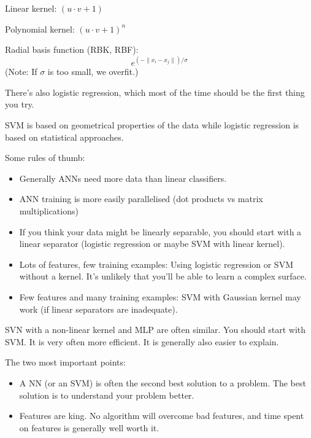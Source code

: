 \newpage

Linear kernel:
$(u\cdot v + 1)$

Polynomial kernel:
$(u\cdot v + 1)^n$

Radial basis function (RBK, RBF):
\begin{displaymath}
  e^{(-\parallel x_i - x_j\parallel) / \sigma}
\end{displaymath}
(Note: If $\sigma$ is too small, we overfit.)



There's also logistic regression, which most of the time should be the
first thing you try.

SVM is based on geometrical properties of the data while logistic
regression is based on statistical approaches.

Some rules of thumb:
\begin{itemize}
\item Generally ANNs need more data than linear classifiers.
\item ANN training is more easily parallelised (dot products vs matrix
  multiplications)
\item If you think your data might be linearly separable, you should
  start with a linear separator (logistic regression or maybe SVM with
  linear kernel).
\item Lots of features, few training examples: Using logistic
  regression or SVM without a kernel.  It's unlikely that you'll be
  able to learn a complex surface.
\item Few features and many training examples: SVM with Gaussian
  kernel may work (if linear separators are inadequate).
\end{itemize}

SVN with a non-linear kernel and MLP are often similar.  You should
start with SVM.  It is very often more efficient.  It is generally
also easier to explain.

The two most important points:
\begin{itemize}
\item A NN (or an SVM) is often the second best solution to a
  problem. The best solution is to understand your problem better.
\item Features are king.  No algorithm will overcome bad features, and
  time spent on features is generally well worth it.
\end{itemize}


